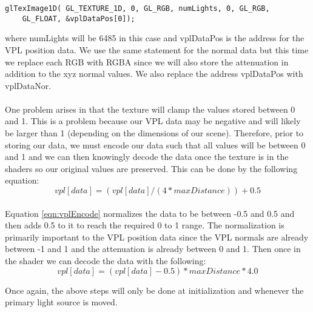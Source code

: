 \begin{lstlisting}
glTexImage1D( GL_TEXTURE_1D, 0, GL_RGB, numLights, 0, GL_RGB, 
	GL_FLOAT, &vplDataPos[0]);
\end{lstlisting}

where numLights will be 6485 in this case and vplDataPos is the address for the VPL position data.  We use the same statement for the normal data but this time we replace each RGB with RGBA since we will also store the attenuation in addition to the xyz normal values.  We also replace the address vplDataPos with vplDataNor.

\paragraph{}
One problem arises in that the texture will clamp the values stored between 0 and 1.  This is a problem because our VPL data may be negative and will likely be larger than 1 (depending on the dimensions of our scene).  Therefore, prior to storing our data, we must encode our data such that all values will be between 0 and 1 and we can then knowingly decode the data once the texture is in the shaders so our original values are preserved.  This can be done by the following equation:
\begin{equation}
vpl[data] = (vpl[data]/(4*maxDistance))+0.5 \label{eqn:vplEncode}
\end{equation}

\paragraph{}
Equation \ref{eqn:vplEncode} normalizes the data to be between -0.5 and 0.5 and then adds 0.5 to it to reach the required 0 to 1 range.  The normalization is primarily important to the VPL position data since the VPL normals are already between -1 and 1 and the attenuation is already between 0 and 1. Then once in the shader we can decode the data with the following:
\begin{equation}
vpl[data] = (vpl[data]-0.5)*maxDistance*4.0 \label{eqn:vplDecode}
\end{equation}

Once again, the above steps will only be done at initialization and whenever the primary light source is moved.


